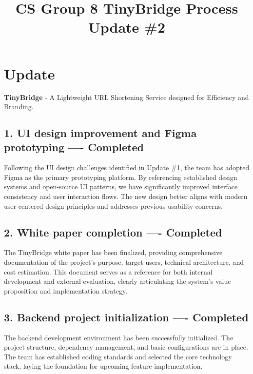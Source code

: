 \documentclass[11pt,a4paper]{article}
\title{\textbf{CS Group 8 TinyBridge Process Update \#2}}
\author{}
\date{}
\begin{document}
\maketitle

\section{Update}

\begin{adjustwidth}{1.5em}{}
\textbf{TinyBridge} - A Lightweight URL Shortening Service designed for Efficiency and Branding.

\subsection{1. UI design improvement and Figma prototyping ---- Completed}

Following the UI design challenges identified in Update \#1, the team has adopted Figma as the primary prototyping platform. By referencing established design systems and open-source UI patterns, we have significantly improved interface consistency and user interaction flows. The new design better aligns with modern user-centered design principles and addresses previous usability concerns.

\subsection{2. White paper completion ---- Completed}

The TinyBridge white paper has been finalized, providing comprehensive documentation of the project's purpose, target users, technical architecture, and cost estimation. This document serves as a reference for both internal development and external evaluation, clearly articulating the system's value proposition and implementation strategy.

\subsection{3. Backend project initialization ---- Completed}

The backend development environment has been successfully initialized. The project structure, dependency management, and basic configurations are in place. The team has established coding standards and selected the core technology stack, laying the foundation for upcoming feature implementation.
\end{adjustwidth}
\end{document}

